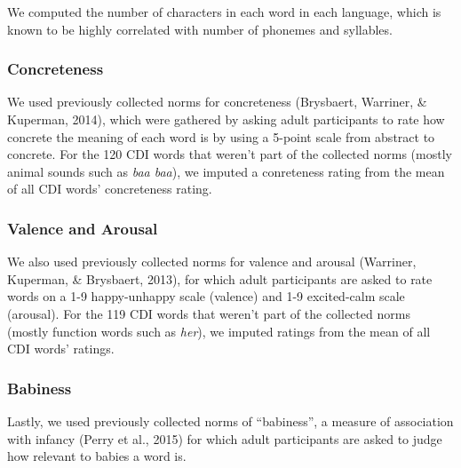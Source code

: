 \documentclass[10pt, letterpaper]{article}
\begin{document}
We computed the number of characters in each word in each language,
which is known to be highly correlated with number of phonemes and
syllables.

\subsubsection{Concreteness}\label{concreteness}

We used previously collected norms for concreteness (Brysbaert,
Warriner, \& Kuperman, 2014), which were gathered by asking adult
participants to rate how concrete the meaning of each word is by using a
5-point scale from abstract to concrete. For the 120 CDI words that
weren't part of the collected norms (mostly animal sounds such as
\emph{baa baa}), we imputed a conreteness rating from the mean of all
CDI words' concreteness rating.

\subsubsection{Valence and Arousal}\label{valence-and-arousal}

We also used previously collected norms for valence and arousal
(Warriner, Kuperman, \& Brysbaert, 2013), for which adult participants
are asked to rate words on a 1-9 happy-unhappy scale (valence) and 1-9
excited-calm scale (arousal). For the 119 CDI words that weren't part of
the collected norms (mostly function words such as \emph{her}), we
imputed ratings from the mean of all CDI words' ratings.

\subsubsection{Babiness}\label{babiness}

Lastly, we used previously collected norms of ``babiness'', a measure of
association with infancy (Perry et al., 2015) for which adult
participants are asked to judge how relevant to babies a word is.
\end{document}
